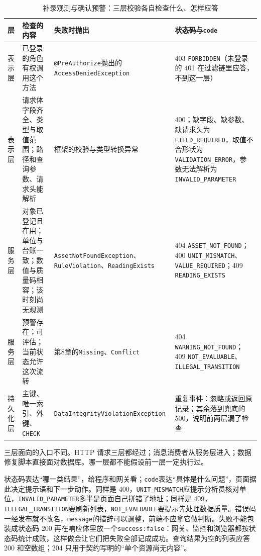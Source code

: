 \begin{table}[htbp]
\centering
\small
\caption{补录观测与确认预警：三层校验各自检查什么、怎样应答}
\label{tab:ch05-error-codes}
\begin{tabular}{p{}p{}p{}p{}}
\toprule
层 & 检查的内容 & 失败时抛出 & 状态码与\texttt{code} \\
\midrule
表示层 & 已登录的角色有权调用这个方法 & \texttt{@PreAuthorize}抛出的\texttt{AccessDenied}\allowbreak\texttt{Exception} & 403 \texttt{FORBIDDEN}（未登录的 401 在过滤链里应答，不到这一层） \\
表示层 & 请求体字段齐全、类型与取值范围；路径和查询参数、请求头能解析 & 框架的校验与类型转换异常 & 400；缺字段、缺参数、缺请求头为\texttt{FIELD\_REQUIRED}，取值不合形状为\texttt{VALIDATION\_ERROR}，参数无法解析为\texttt{INVALID\_PARAMETER} \\
服务层 & 对象已登记且在用；单位与台账一致；数值与质量码相容；该时刻尚无观测 & \texttt{AssetNotFound}\allowbreak\texttt{Exception}、\texttt{RuleViolation}、\texttt{ReadingExists} & 404 \texttt{ASSET\_NOT\_FOUND}；400 \texttt{UNIT\_MISMATCH}、\texttt{VALUE\_REQUIRED}；409 \texttt{READING\_EXISTS} \\
服务层 & 预警存在；可评估；当前状态允许这次流转 & 第8章的\texttt{Missing}、\texttt{Conflict} & 404 \texttt{WARNING\_NOT\_FOUND}；409 \texttt{NOT\_EVALUABLE}、\texttt{ILLEGAL\_TRANSITION} \\
持久化层 & 主键、唯一索引、外键、\texttt{CHECK} & \texttt{DataIntegrity}\allowbreak\texttt{ViolationException} & 重复事件：忽略或返回原记录；其余落到兜底的 500，说明前两层漏了检查 \\
\bottomrule
\end{tabular}
\end{table}

三层面向的入口不同。HTTP 请求三层都经过；消息消费者从服务层进入；数据修复脚本直接面对数据库。哪一层都不能假设前一层一定执行过。

状态码表达“哪一类结果”，给程序和网关看；\texttt{code}表达“具体是什么问题”，页面据此决定提示语和下一步动作。同样是 400，\texttt{UNIT\_MISMATCH}应提示分析员核对单位，\texttt{INVALID\_PARAMETER}多半是页面自己拼错了地址；同样是 409，\texttt{ILLEGAL\_TRANSITION}要刷新列表，\texttt{NOT\_EVALUABLE}要提示先处理数据质量。错误码一经发布就不改名，\texttt{message}的措辞可以调整，前端不应拿它做判断。失败不能包装成状态码 200 再在响应体里放一个\texttt{success:false}：网关、监控和浏览器都按状态码统计成败，这样做会让它们把失败全部记成成功。查询结果为空的列表应答 200 和空数组；204 只用于契约写明的“单个资源尚无内容”。

